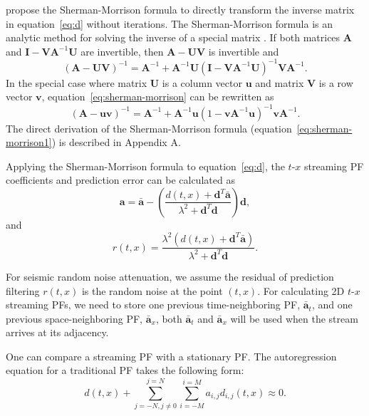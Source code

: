 \cite{Fomel16} propose the Sherman-Morrison formula to directly
transform the inverse matrix in equation~\ref{eq:d} without
iterations. The Sherman-Morrison formula is an analytic method for
solving the inverse of a special matrix \cite[]{Hager89}. If both
matrices $\mathbf{A}$ and
$\mathbf{I}-\mathbf{V}\mathbf{A}^{-1}\mathbf{U}$ are invertible, then
$\mathbf{A}-\mathbf{U}\mathbf{V}$ is invertible and
\begin{equation}
  \label{eq:sherman-morrison}
(\mathbf{A}-\mathbf{U}\mathbf{V})^{-1}=\mathbf{A}^{-1}+
\mathbf{A}^{-1}\mathbf{U}(\mathbf{I}-
\mathbf{V}\mathbf{A}^{-1}\mathbf{U})^{-1}\mathbf{V}\mathbf{A}^{-1}.
\end{equation}
In the special case where matrix $\mathbf{U}$ is a column vector
$\mathbf{u}$ and matrix $\mathbf{V}$ is a row vector $\mathbf{v}$,
equation~\ref{eq:sherman-morrison} can be rewritten as
\begin{equation}
  \label{eq:sherman-morrison1}
(\mathbf{A}-\mathbf{u}\mathbf{v})^{-1}=\mathbf{A}^{-1}+
\mathbf{A}^{-1}\mathbf{u}(1-
\mathbf{v}\mathbf{A}^{-1}\mathbf{u})^{-1}\mathbf{v}\mathbf{A}^{-1}.
\end{equation}
The direct derivation of the Sherman-Morrison formula
(equation~\ref{eq:sherman-morrison1}) is described in Appendix A.

Applying the Sherman-Morrison formula to
equation~\ref{eq:d}, the $t$-$x$ streaming PF coefficients and
prediction error can be calculated as
\begin{equation}
  \label{eq:f}
\mathbf{a}=\mathbf{\bar{a}}-\left(\frac{d(t,x)+\mathbf{d}^T\mathbf{\bar{a}}}
{\lambda^2+\mathbf{d}^T\mathbf{d}}\right)\mathbf{d},
\end{equation}
and
\begin{equation}
  \label{eq:g}
r(t,x)=\frac{\lambda^2(d(t,x)+\mathbf{d}^T\mathbf{\bar{a}})}
{\lambda^2+\mathbf{d}^T\mathbf{d}}.
\end{equation}

For seismic random noise attenuation, we assume the residual of
prediction filtering $r(t,x)$ is the random noise at the point
$(t,x)$. For calculating 2D $t$-$x$ streaming PFs, we need to store
one previous time-neighboring PF, $\mathbf{\bar{a}}_t$, and
one previous space-neighboring PF,
$\mathbf{\bar{a}}_x$, both $\mathbf{\bar{a}}_t$ and
$\mathbf{\bar{a}}_x$ will be used when the stream arrives at its
adjacency.

One can compare a streaming PF with a stationary
PF. The autoregression equation for a traditional PF takes the
following form:
\begin{equation}
  \label{eq:h}
d(t,x)+\sum_{j=-N,j\neq0}^{j=N}\sum_{i=-M}^{i=M}a_{i,j}d_{i,j}(t,x) \approx 0.
\end{equation}

